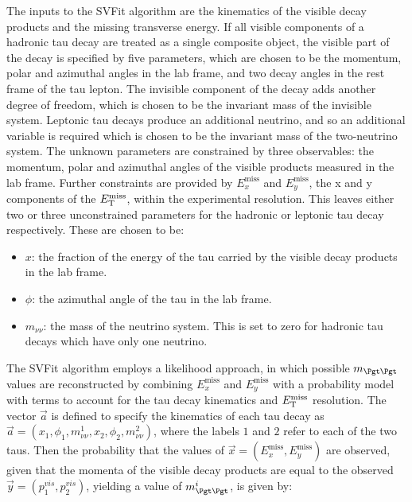 The inputs to the SVFit algorithm are the kinematics of the visible decay
products and the missing transverse energy. If all visible components of a
hadronic tau decay are treated as a single composite object, the visible part of
the decay is specified by five parameters, which are chosen to be the momentum,
polar and azimuthal angles in the lab frame, and two decay angles in the rest
frame of the tau lepton. The invisible component of the decay adds another
degree of freedom, which is chosen to be the invariant mass of the invisible
system. Leptonic tau decays produce an additional neutrino, and so an additional
variable is required which is chosen to be the invariant mass of the
two-neutrino system. The unknown parameters are constrained by three
observables: the momentum, polar and azimuthal angles of the visible products
measured in the lab frame. Further constraints are provided by
$E_{x}^{\text{miss}}$ and $E_{y}^{\text{miss}}$, the x and y components of the
$E_{\mathrm{T}}^{\text{miss}}$, within the experimental resolution. This leaves either two or three 
unconstrained parameters for the hadronic or leptonic tau decay respectively. 
These are chosen to be:

\begin{itemize}
\item $x$: the fraction of the energy of the tau carried by the visible decay
products in the lab frame.
\item $\phi$: the azimuthal angle of the tau in the lab frame. 
\item $m_{\nu\nu}$: the mass of the neutrino system. This is set to zero for hadronic tau
decays which have only one neutrino.
\end{itemize}

The SVFit algorithm employs a likelihood approach, in which possible
$m_{\Pgt\Pgt}$ values are reconstructed by combining $E_{x}^{\text{miss}}$ and
$E_{y}^{\text{miss}}$ with a probability model with terms to account for the tau
decay kinematics and $E_{\mathrm{T}}^{\text{miss}}$ resolution. The vector $\vec{a}$ is defined to
specify the kinematics of each tau decay as $\vec{a} =
\left(x_{1},\phi_{1},m_{\nu\nu}^{1},x_{2},\phi_{2},m_{\nu\nu}^{2}\right)$, where
the labels $1$ and $2$ refer to each of the two taus. Then the
probability that the values of $\vec{x} = \left(E_{x}^{\text{miss}},
E_{y}^{\text{miss}}\right)$ are observed, given that the momenta of the visible decay products are
equal to the observed $\vec{y} = \left(p_{1}^{vis},p_{2}^{vis} \right)$,
yielding a value of $m_{\Pgt\Pgt}^{i}$, is given by: 

